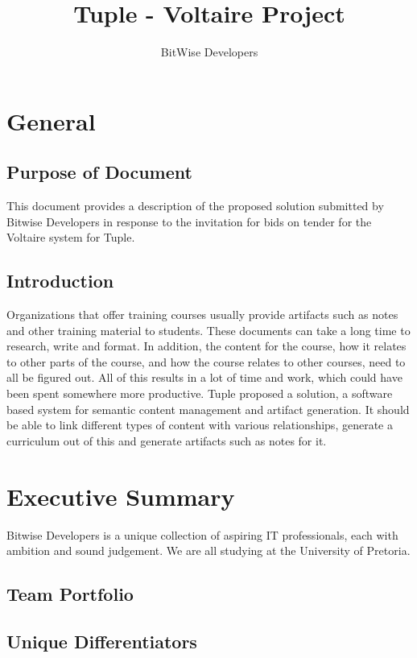 \documentclass[a4paper]{article}
\title{Tuple - Voltaire Project}
\author{BitWise Developers}
\begin{document}
\maketitle
	\section{General}

		\subsection{Purpose of Document}

This document provides a description of the proposed solution submitted by Bitwise  Developers in response to the invitation for bids on tender for the Voltaire system for Tuple.

		\subsection{Introduction}
Organizations that offer training courses usually provide artifacts such as notes and other training material to students. These documents can take a long time to research, write and format. In addition, the content for the course, how it relates to other parts of the course, and how the course relates to other courses, need to all be figured out. All of this results in a lot of time and work, which could have been spent somewhere more productive. Tuple proposed a solution, a software based system for semantic content management and artifact generation. It should be able to link different types of content with various relationships, generate a curriculum out of this and generate artifacts such as notes for it.
		

	\section{Executive Summary}

Bitwise Developers is a unique collection of aspiring IT professionals, each with ambition and sound judgement. We are all studying at the University of Pretoria.

		\subsection{Team Portfolio}


		\subsection{Unique Differentiators}
        
\end{document}
